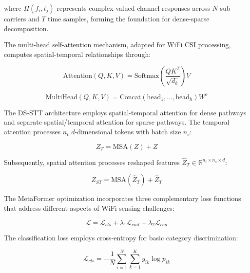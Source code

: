\documentclass[journal]{IEEEtran}
\begin{document}
where $H(f_i,t_j)$ represents complex-valued channel responses across $N$ sub-carriers and $T$ time samples, forming the foundation for dense-sparse decomposition.

The multi-head self-attention mechanism, adapted for WiFi CSI processing, computes spatial-temporal relationships through:

\begin{equation}
\text{Attention}(Q,K,V) = \text{Softmax}\left(\frac{QK^T}{\sqrt{d_k}}\right)V
\label{eq:metaformer_attention}
\end{equation}

\begin{equation}
\text{MultiHead}(Q,K,V) = \text{Concat}(\text{head}_1, \ldots, \text{head}_h)W^o
\label{eq:metaformer_multihead}
\end{equation}

The DS-STT architecture employs spatial-temporal attention for dense pathways and separate spatial/temporal attention for sparse pathways. The temporal attention processes $n_t$ $d$-dimensional tokens with batch size $n_s$:

\begin{equation}
Z_T = \text{MSA}(Z) + Z
\label{eq:metaformer_temporal}
\end{equation}

Subsequently, spatial attention processes reshaped features $\hat{Z}_T \in \mathbb{R}^{n_t \times n_s \times d}$:

\begin{equation}
Z_{ST} = \text{MSA}(\hat{Z}_T) + \hat{Z}_T
\label{eq:metaformer_spatial}
\end{equation}

The MetaFormer optimization incorporates three complementary loss functions that address different aspects of WiFi sensing challenges:

\begin{equation}
\mathcal{L} = \mathcal{L}_{cls} + \lambda_1 \mathcal{L}_{cml} + \lambda_2 \mathcal{L}_{cen}
\label{eq:metaformer_total_loss}
\end{equation}

The classification loss employs cross-entropy for basic category discrimination:

\begin{equation}
\mathcal{L}_{cls} = -\frac{1}{N} \sum_{i=1}^{N} \sum_{k=1}^{K} y_{ik} \log p_{ik}
\label{eq:metaformer_classification_loss}
\end{equation}
\end{document}
